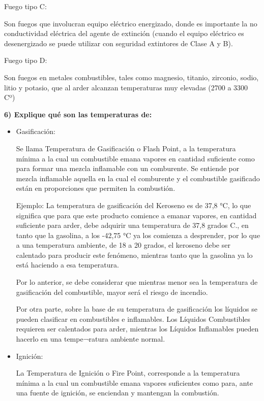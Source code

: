 \documentclass[letterpaper,11pt]{article}
\begin{document}
Fuego tipo C:

Son fuegos que involucran equipo eléctrico energizado, donde es importante la no conductividad eléctrica del agente de extinción (cuando el equipo eléctrico es desenergizado se puede utilizar con seguridad extintores de Clase A y B).


Fuego tipo D:

Son fuegos en metales combustibles, tales como magnesio, titanio, zirconio, sodio, litio y potasio, que al arder alcanzan temperaturas muy elevadas (2700 a 3300 Cº)


\textbf{6) Explique qué son las temperaturas de:}
\begin{itemize}
	
    \item Gasificación:
    
     Se llama Temperatura de Gasificación o Flash Point, a la temperatura mínima a la cual un combustible emana vapores en cantidad suficiente como para formar una mezcla inflamable con un comburente. Se entiende por mezcla inflamable aquella en la cual el comburente y el combustible gasificado están en proporciones que permiten la combustión.
    
    Ejemplo: La temperatura de gasificación del Keroseno es de 37,8 °C, lo que significa que para que este producto comience a emanar vapores, en cantidad suficiente para arder, debe adquirir una temperatura de 37,8 grados C., en tanto que la gasolina, a los -42,75 °C ya los comienza a desprender, por lo que a una temperatura ambiente, de 18 a 20 grados, el keroseno debe ser calentado para producir este fenómeno, mientras tanto que la gasolina ya lo está haciendo a esa temperatura.
    
    Por lo anterior, se debe considerar que mientras menor sea la temperatura de gasificación del combustible, mayor será el riesgo de incendio.
    
    Por otra parte, sobre la base de su temperatura de gasificación los líquidos se pueden clasificar en combustibles e inflamables. Los Líquidos Combustibles requieren ser calentados para arder, mientras los Líquidos Inflamables pueden hacerlo en una tempe¬ratura ambiente normal.
    
    \item Ignición:
    
     La Temperatura de Ignición o Fire Point, corresponde a la temperatura mínima a la cual un combustible emana vapores suficientes como para, ante una fuente de ignición, se enciendan y mantengan la combustión.
    

\end{itemize}
\end{document}
